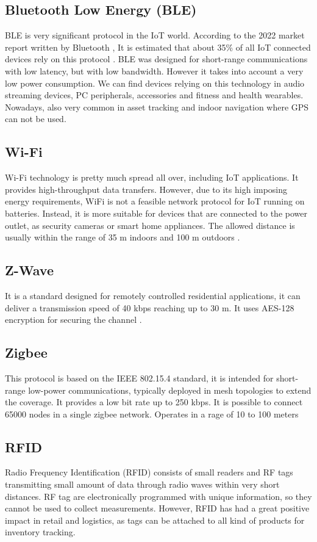 \subsection{Bluetooth Low Energy (BLE)}
BLE is very significant protocol in the IoT world. According to the 2022 market report written by Bluetooth \textregistered, It is estimated that about 35\% of all IoT connected devices rely on this protocol \cite{BLE1}.
BLE was designed for short-range communications with low latency, but with low bandwidth. However it takes into account a very low power consumption. We can find devices relying on this technology in audio streaming devices, PC peripherals, accessories and fitness and health wearables. Nowadays, also very common in asset tracking and indoor navigation where GPS can not be used.

\subsection{Wi-Fi} \label{sec:wifi}
Wi-Fi technology is pretty much spread all over, including IoT applications. It provides high-throughput data transfers. However, due to its high imposing energy requirements, WiFi is not a feasible network protocol for IoT running on batteries. Instead, it is more suitable for devices that are connected to the power outlet, as security cameras or smart home appliances. The allowed distance is usually within the range of 35 m indoors and 100 m outdoors \cite{IEEE:protocols2}.

\subsection{Z-Wave}
It is a standard designed for remotely controlled residential applications, it can deliver a transmission speed of 40 kbps reaching up to 30 m. It uses AES-128 encryption for securing the channel \cite{IEEE:protocols2}.

\subsection{Zigbee}
This protocol is based on the IEEE 802.15.4 standard, it is intended for short-range low-power communications, typically deployed in mesh topologies to extend the coverage. It provides a low bit rate up to 250 kbps. It is possible to connect 65000 nodes in a single zigbee network. Operates in a rage of 10 to 100 meters 

\subsection{RFID}
Radio Frequency Identification (RFID) consists of small readers and RF tags transmitting small amount of data through radio waves within very short distances. RF tag are electronically programmed with unique information, so they cannot be used to collect measurements. However, RFID has had a great positive impact in retail and logistics, as tags can be attached to all kind of products for inventory tracking.

